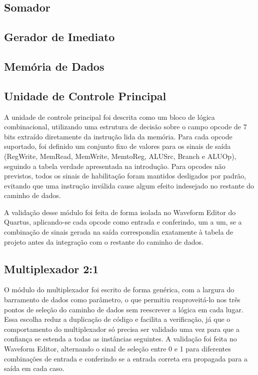 \documentclass[conference]{IEEEtran}
\begin{document}
\subsection{Somador}

\subsection{Gerador de Imediato}

\subsection{Memória de Dados}

\subsection{Unidade de Controle Principal}
A unidade de controle principal foi descrita como um bloco de lógica combinacional, utilizando uma
estrutura de decisão sobre o campo opcode de 7 bits extraído diretamente da instrução lida da memória.
Para cada opcode suportado, foi definido um conjunto fixo de valores para os sinais de saída (RegWrite,
MemRead, MemWrite, MemtoReg, ALUSrc, Branch e ALUOp), seguindo a tabela verdade apresentada na
introdução. Para opcodes não previstos, todos os sinais de habilitação foram mantidos desligados por
padrão, evitando que uma instrução inválida cause algum efeito indesejado no restante do caminho de dados.

A validação desse módulo foi feita de forma isolada no Waveform Editor do Quartus, aplicando-se cada
opcode como entrada e conferindo, um a um, se a combinação de sinais gerada na saída correspondia
exatamente à tabela de projeto antes da integração com o restante do caminho de dados.

\subsection{Multiplexador 2:1}
O módulo do multiplexador foi escrito de forma genérica, com a largura do barramento de dados como
parâmetro, o que permitiu reaproveitá-lo nos três pontos de seleção do caminho de dados sem reescrever a
lógica em cada lugar. Essa escolha reduz a duplicação de código e facilita a verificação, já que o
comportamento do multiplexador só precisa ser validado uma vez para que a confiança se estenda a todas as
instâncias seguintes. A validação foi feita no Waveform Editor, alternando o sinal de seleção entre 0 e 1
para diferentes combinações de entrada e conferindo se a entrada correta era propagada para a saída em
cada caso.
\end{document}
